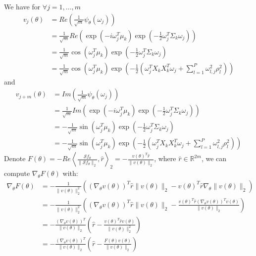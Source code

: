 \documentclass[12pt,a4paper]{article}
\begin{document}
\begin{itemize}
    We have for $\forall j = 1,...,m$
    \begin{equation}
    \begin{aligned}
        v_j(\theta) &= Re(\frac{1}{\sqrt{m}}\psi_\theta(\omega_j)) \\
        &= \frac{1}{\sqrt{m}} Re(\exp(-i\omega_j^T\mu_k)\exp(-\frac{1}{2}\omega_j^T \Sigma_k \omega_j))
        \\ &= \frac{1}{\sqrt{m}} \cos{(\omega_j^T\mu_k)}\exp(-\frac{1}{2}\omega_j^T \Sigma_k \omega_j)
        \\ &= \frac{1}{\sqrt{m}} \cos{(\omega_j^T\mu_k)}\exp(-\frac{1}{2}(\omega_j^T X_k X_k^T \omega_j + \sum_{l = 1}^P \omega_{l,j}^2\rho_l^2))
    \end{aligned}
    \end{equation}
    and
    \begin{equation}
        \begin{aligned}
        v_{j+m}(\theta) &= Im(\frac{1}{\sqrt{m}}\psi_\theta(\omega_j)) \\
        &= \frac{1}{\sqrt{m}} Im(\exp(-i\omega_j^T\mu_k)\exp(-\frac{1}{2}\omega_j^T \Sigma_k \omega_j))
        \\ &= -\frac{1}{\sqrt{m}} \sin{(\omega_j^T\mu_k)}\exp(-\frac{1}{2}\omega_j^T \Sigma_k \omega_j)
        \\&= -\frac{1}{\sqrt{m}} \sin{(\omega_j^T\mu_k)}\exp(-\frac{1}{2}(\omega_j^T X_k X_k^T \omega_j + \sum_{l = 1}^P \omega_{l,j}^2\rho_l^2))
    \end{aligned}
    \end{equation}
    Denote $F(\theta) = - Re\left\langle \frac{\mathcal{S}f_\theta}{\|\mathcal{S}f_\theta\|_2}, \hat{r} \right\rangle_2 = - \frac{v(\theta)^T \hat{r}}{\|v(\theta)\|_2}$, where $\hat{r} \in \mathbb{R}^{2m}$, we can compute $\nabla_\theta F(\theta)$ with:
    \begin{equation}
        \begin{aligned}
            \nabla_\theta F(\theta) &= - \frac{1}{\|v(\theta)\|_2^2}((\nabla_\theta v(\theta))^T \hat{r} \|v(\theta)\|_2 -  v(\theta)^T \hat{r} \nabla_\theta \|v(\theta)\|_2) \\&= -\frac{1}{\|v(\theta)\|_2^2}((\nabla_\theta v(\theta))^T \hat{r} \|v(\theta)\|_2 -  \frac{v(\theta)^T \hat{r}(\nabla_\theta v(\theta) )^T v(\theta) }{\|v(\theta)\|_2} )
        \\&= - \frac{(\nabla_\theta v(\theta) )^T }{\|v(\theta)\|_2} (\hat{r}-\frac{v(\theta)^T \hat{r} v(\theta)}{\|v(\theta)\|_2^2})  
        \\&=  - \frac{(\nabla_\theta v(\theta) )^T }{\|v(\theta)\|_2} (\hat{r}-\frac{F(\theta)v(\theta)}{\|v(\theta)\|_2})  

\end{aligned}
\end{equation}
\end{itemize}
\end{document}
